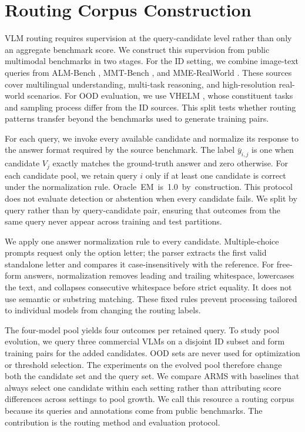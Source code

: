 \documentclass[letterpaper]{article}
\begin{document}
\section{Routing Corpus Construction}
\label{sec:corpus}

VLM routing requires supervision at the query-candidate level rather than only
an aggregate benchmark score. We construct this supervision from public
multimodal benchmarks in two stages. For the ID setting, we combine image-text
queries from ALM-Bench \citep{ALM-bench}, MMT-Bench \citep{MMT-Bench}, and
MME-RealWorld \citep{MME-RealWorld}. These sources cover multilingual
understanding, multi-task reasoning, and high-resolution real-world scenarios.
For OOD evaluation, we use VHELM \citep{VHELM}, whose constituent tasks and
sampling process differ from the ID sources. This split tests whether routing
patterns transfer beyond the benchmarks used to generate training pairs.

For each query, we invoke every available candidate and normalize its response
to the answer format required by the source benchmark. The label
$\bar y_{i,j}$ is one when candidate $V_j$ exactly matches the ground-truth
answer and zero otherwise. For each candidate pool, we retain query $i$ only if
at least one candidate is correct under the normalization rule.
\mbox{Oracle EM is 1.0 by construction.} This protocol does not evaluate detection or
abstention when every candidate fails. We split by query rather than by
query-candidate pair, ensuring that outcomes from the same query never appear
across training and test partitions.

We apply one answer normalization rule to every candidate. Multiple-choice prompts
request only the option letter; the parser extracts the first valid standalone
letter and compares it case-insensitively with the reference. For free-form
answers, normalization removes leading and trailing whitespace, lowercases the
text, and collapses consecutive whitespace before strict equality. It does not
use semantic or substring matching. These fixed rules prevent processing
tailored to individual models from changing the routing labels.

The four-model pool yields four outcomes per retained query. To study pool
evolution, we query three commercial VLMs on a disjoint ID subset and form
training pairs for the added candidates. OOD sets are never used for optimization
or threshold selection. The experiments on the evolved pool therefore change
both the candidate set and the query set. We compare ARMS with baselines that
always select one candidate within each setting rather than attributing score
differences across settings to pool growth. We call this resource a routing corpus because
its queries and annotations come from public benchmarks. The contribution is the
routing method and evaluation protocol.
\end{document}
